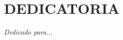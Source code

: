 
\chapter*{\hfill DEDICATORIA}
\thispagestyle{empty}

\doublespacing

\begin{flushright}
    \textit{Dedicado para...}
\end{flushright}

\restoregeometry
